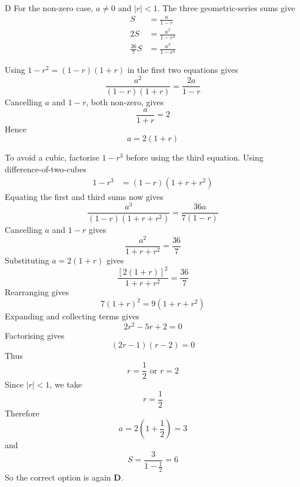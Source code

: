 \documentclass[11pt,a4paper]{article}
\begin{document}
\begin{enumerate}[label=\textbf{\arabic*.},leftmargin=*,itemsep=0pt,start=1]
\begin{djsSolution}{D}
For the non-zero case, $a\ne0$ and $|r|<1$. The three geometric-series sums give
\[
\begin{aligned}
S&=\frac{a}{1-r}\\[5pt]
2S&=\frac{a^2}{1-r^2}\\[5pt]
\frac{36}{7}S&=\frac{a^3}{1-r^3}
\end{aligned}
\]

Using $1-r^2=(1-r)(1+r)$ in the first two equations gives
\[
\frac{a^2}{(1-r)(1+r)}=\frac{2a}{1-r}
\]
Cancelling $a$ and $1-r$, both non-zero, gives
\[
\frac{a}{1+r}=2
\]
Hence
\[
a=2(1+r)
\]

To avoid a cubic, factorise $1-r^3$ before using the third equation. Using difference-of-two-cubes
\[
\begin{aligned}
1-r^3&=(1-r)(1+r+r^2)
\end{aligned}
\]
Equating the first and third sums now gives
\[
\frac{a^3}{(1-r)(1+r+r^2)}=\frac{36a}{7(1-r)}
\]
Cancelling $a$ and $1-r$ gives
\[
\frac{a^2}{1+r+r^2}=\frac{36}{7}
\]
Substituting $a=2(1+r)$ gives
\[
\frac{[2(1+r)]^2}{1+r+r^2}=\frac{36}{7}
\]
Rearranging gives
\[
7(1+r)^2=9(1+r+r^2)
\]
Expanding and collecting terms gives
\[
2r^2-5r+2=0
\]
Factorising gives
\[
(2r-1)(r-2)=0
\]
Thus
\[
r=\frac12\text{ or }r=2
\]
Since $|r|<1$, we take
\[
r=\frac12
\]
Therefore
\[
a=2\left(1+\frac12\right)=3
\]
and
\[
S=\frac{3}{1-\frac12}=6
\]
So the correct option is again \textbf{D}.
\end{djsSolution}
\end{enumerate}
\clearpage
\thispagestyle{djssolutions}
\vspace*{8pt}
\end{document}
